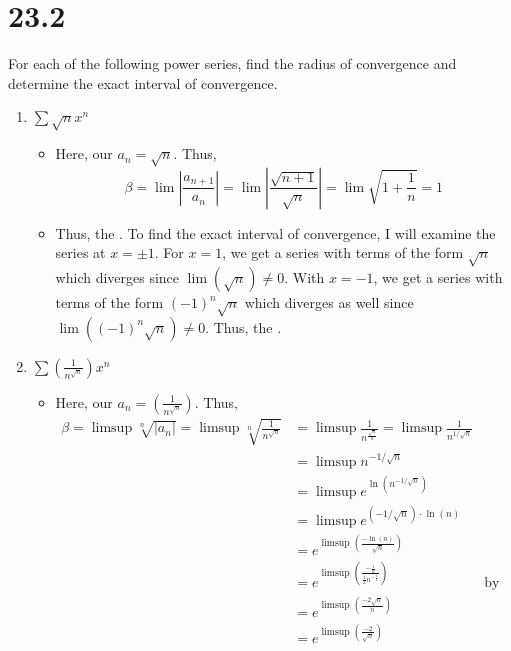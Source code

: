 \documentclass[10pt,a4paper]{article}
\theoremstyle{definition}
\begin{document}
\section*{23.2}
For each of the following power series, find the radius of convergence and determine the exact interval of convergence.
\begin{enumerate}[label = (\alph*)]
\item $\displaystyle \sum \sqrt{n}x^n$
	\begin{itemize}
	\item Here, our $\displaystyle a_n = \sqrt{n}$. Thus,
	\[\beta = \lim \left|\frac{a_{n+1}}{a_n}\right| = \lim \left|\frac{\sqrt{n+1}}{\sqrt{n}}\right| = \lim \sqrt{1 + \frac{1}{n}} = 1\]
	\item Thus, the . To find the exact interval of convergence, I will examine the series at $x = \pm 1$. For $x = 1$, we get a series with terms of the form $\displaystyle \sqrt{n}$ which diverges since $\lim(\sqrt{n}) \neq 0$. With $x = -1$, we get a series with terms of the form $\displaystyle (-1)^n\sqrt{n}$ which diverges as well since $\lim ((-1)^n\sqrt{n}) \neq 0$. Thus, the .
	\end{itemize}
\item $\displaystyle \sum \left(\frac{1}{n^{\sqrt{n}}}\right)x^n$
	\begin{itemize}
	\item Here, our $\displaystyle a_n = \left(\frac{1}{n^{\sqrt{n}}}\right)$. Thus,
	\begin{align*}\beta = \limsup \sqrt[n]{|a_n|} = \limsup \sqrt[n]{\frac{1}{n^{\sqrt{n}}}} &= \limsup \frac{1}{n^{\frac{\sqrt{n}}{n}}} = \limsup \frac{1}{n^{1/\sqrt{n}}}\\
	&= \limsup n^{-1/\sqrt{n}}\\
	&= \limsup e^{\displaystyle \ln(n^{-1/\sqrt{n}})}\\
	&= \limsup e^{\displaystyle (-1/\sqrt{n})\cdot \ln(n)}\\
	&= e^{\displaystyle \limsup\left(\frac{-\ln(n)}{\sqrt{n}}\right)}\\
	&= e^{\displaystyle \limsup \left(\frac{-\frac{1}{n}}{\frac{1}{2}n^{-\frac{1}{2}}}\right) } &\text{by L'Hopital's Rule}\\
	&= e^{\displaystyle \limsup \left(\frac{-2\sqrt{n}}{n}\right) }\\
	&= e^{\displaystyle \limsup \left(\frac{-2}{\sqrt{n}}\right) }\\

\end{align*}
\end{itemize}
\end{enumerate}
\end{document}
